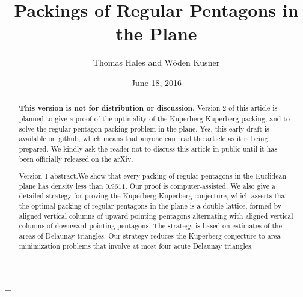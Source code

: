 \documentclass{amsart}
\theoremstyle{plain}
\theoremstyle{definition}
\theoremstyle{remark}
\begin{document}
\title
    {Packings of Regular Pentagons in the Plane}
\author{Thomas Hales and W\"oden Kusner}
\date{June 18, 2016}

\begin{abstract}  
{\bf This version is not for distribution or discussion.}
Version 2 of this article is planned to give a proof of the optimality of the Kuperberg-Kuperberg packing,
and to solve the regular pentagon packing problem in the plane.  Yes, this early draft is available on
github, which means that anyone can read the article as it is being prepared.  We kindly ask
the reader not to discuss this article in public until it has been officially released on the arXiv.

{\sc Version 1 abstract.}\quad We show that every packing of regular pentagons in the Euclidean plane has
density less than $0.9611$.   Our proof is computer-assisted.  We also 
give a detailed strategy for proving the Kuperberg-Kuperberg
conjecture, which asserts that the optimal packing of regular pentagons in the plane is a double lattice,
formed by aligned vertical columns of upward pointing pentagons alternating
with aligned vertical columns of downward pointing pentagons.  The strategy is based on estimates
of the areas of Delaunay triangles.  Our strategy reduces the Kuperberg conjecture to
area minimization problems that involve at most four acute Delaunay triangles.
\end{abstract}


\parskip=\baselineskip

 \maketitle



    

      
      
       
%
      
      
%





%
\end{document}
